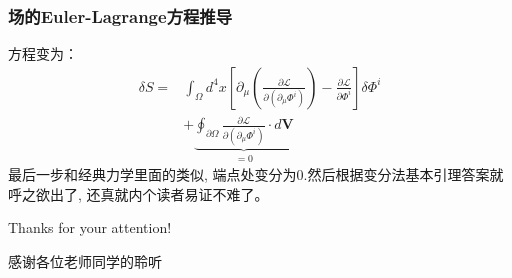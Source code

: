 \documentclass{whu-beamer}
\begin{document}
\begin{frame}
  \frametitle{场的Euler-Lagrange方程推导}
  方程变为：
  \begin{align*}
    \delta S=&\int_\Omega d^4x\left[\partial_\mu\left(\frac{\partial\mathscr{L}}{\partial(\partial_\mu \Phi^i)}\right)-\frac{\partial\mathscr{L}}{\partial \Phi^i}\right]\delta\Phi^i\\
    &+\underbrace{\oint_{\partial\Omega}\frac{\partial\mathscr{L}}{\partial(\partial_\mu\Phi^i)}\cdot d\mathbf{V}}_{=0}
  \end{align*}
  最后一步和经典力学里面的类似, 端点处变分为0.然后根据变分法基本引理答案就呼之欲出了, 还真就内个读者易证不难了。
\end{frame}





\begin{acknowledgements}[color = blue!80]
  Thanks for your attention!

  感谢各位老师同学的聆听
\end{acknowledgements}
\end{document}

